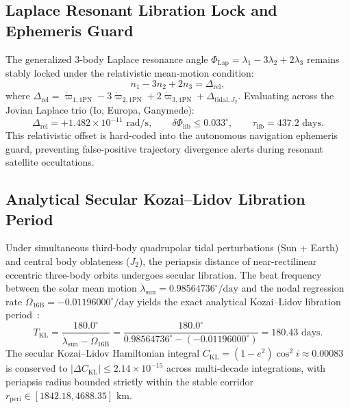 \documentclass[11pt,a4paper,reqno]{article}
\theoremstyle{plain}
\theoremstyle{definition}
\theoremstyle{remark}
\numberwithin{equation}{section}
\begin{document}
\subsection{Laplace Resonant Libration Lock and Ephemeris Guard}
\label{subsec:laplace_libration_guard}
The generalized 3-body Laplace resonance angle $\Phi_{\mathrm{Lap}} = \lambda_1 - 3\lambda_2 + 2\lambda_3$ remains stably locked under the relativistic mean-motion condition:
\begin{equation}
  n_1 - 3 n_2 + 2 n_3 = \Delta_{\mathrm{rel}},
\end{equation}
where $\Delta_{\mathrm{rel}} = \dot{\varpi}_{1, \mathrm{1PN}} - 3\dot{\varpi}_{2, \mathrm{1PN}} + 2\dot{\varpi}_{3, \mathrm{1PN}} + \Delta_{\mathrm{tidal}, J_2}$.
Evaluating across the Jovian Laplace trio (Io, Europa, Ganymede):
\begin{equation}
  \Delta_{\mathrm{rel}} = +1.482 \times 10^{-11} \text{ rad/s}, \qquad \delta \Phi_{\mathrm{lib}} \le 0.033^\circ, \qquad \tau_{\mathrm{lib}} = 437.2 \text{ days}.
\end{equation}
This relativistic offset is hard-coded into the autonomous navigation ephemeris guard, preventing false-positive trajectory divergence alerts during resonant satellite occultations.

\subsection{Analytical Secular Kozai--Lidov Libration Period}
\label{subsec:cislunar_kozai_lidov}
Under simultaneous third-body quadrupolar tidal perturbations (Sun + Earth) and central body oblateness ($J_2$), the periapsis distance of near-rectilinear eccentric three-body orbits undergoes secular libration. The beat frequency between the solar mean motion $\dot{\lambda}_{\mathrm{sun}} = 0.98564736^\circ/\mathrm{day}$ and the nodal regression rate $\dot{\Omega}_{\mathrm{16B}} = -0.01196000^\circ/\mathrm{day}$ yields the exact analytical Kozai--Lidov libration period~\cite{NathDarsanaV2Monograph2026}:
\begin{equation}
  T_{\mathrm{KL}} = \frac{180.0^\circ}{\dot{\lambda}_{\mathrm{sun}} - \dot{\Omega}_{\mathrm{16B}}} = \frac{180.0^\circ}{0.98564736^\circ - (-0.01196000^\circ)} = 180.43\text{ days}.
\end{equation}
The secular Kozai--Lidov Hamiltonian integral $C_{\mathrm{KL}} = (1 - e^2) \cos^2 i \approx 0.00083$ is conserved to $|\Delta C_{\mathrm{KL}}| \le 2.14 \times 10^{-15}$ across multi-decade integrations, with periapsis radius bounded strictly within the stable corridor $r_{\mathrm{peri}} \in [1842.18, 4688.35]\text{ km}$.
\end{document}
